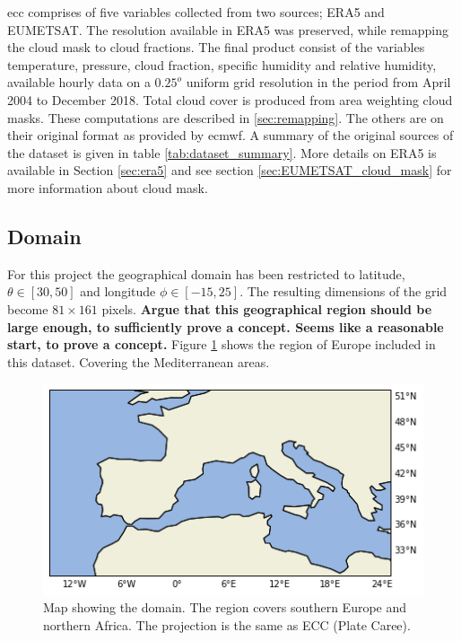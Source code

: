 \acrfull{ecc} comprises of five variables collected from two sources; ERA5 and EUMETSAT. The resolution available in ERA5 was preserved, while remapping the cloud mask to cloud fractions. The final product consist of the variables temperature, pressure, cloud fraction, specific humidity and relative humidity, available hourly data on a $0.25^o$ uniform grid resolution in the period from April 2004 to December 2018. Total cloud cover is produced from area weighting cloud masks. These computations are described in \ref{sec:remapping}. The others are on their original format as provided by \acrfull{ecmwf}. A summary of the original sources of the dataset is given in table \ref{tab:dataset_summary}. More details on ERA5 is available in Section \ref{sec:era5} and see section \ref{sec:EUMETSAT_cloud_mask} for more information about cloud mask. 


\subsection{Domain}
For this project the geographical domain has been restricted to latitude, $\theta \in[30,50]$ and longitude $\phi \in [-15, 25]$. The resulting dimensions of the grid become $81\times161$ pixels.\textbf{ Argue that this geographical region should be large enough, to sufficiently prove a concept. Seems like a reasonable start, to prove a concept.}
Figure \ref{fig:map} shows the region of Europe included in this dataset. Covering the Mediterranean areas.

\begin{figure}[h]
    \centering
    \includegraphics[scale = 0.7]{Chapter4_Results/figurs/Domain.png}
    \caption[Map over domain.]{Map showing the domain. The region covers southern Europe and northern Africa. The projection is the same as ECC (Plate Caree).}
    \label{fig:map}
\end{figure}

